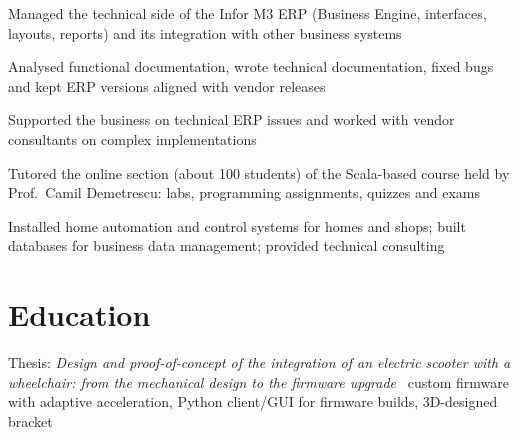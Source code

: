 \documentclass[a4paper,10pt]{article}
\begin{document}
\begin{cvitems}
  \item Managed the technical side of the Infor M3 ERP (Business Engine, interfaces, layouts, reports) and its integration with other business systems
  \item Analysed functional documentation, wrote technical documentation, fixed bugs and kept ERP versions aligned with vendor releases
  \item Supported the business on technical ERP issues and worked with vendor consultants on complex implementations
\end{cvitems}

\begin{cvitems}
  \item Tutored the online section (about 100 students) of the Scala-based course held by Prof.\ Camil Demetrescu: labs, programming assignments, quizzes and exams
\end{cvitems}


\begin{cvitems}
  \item Installed home automation and control systems for homes and shops; built databases for business data management; provided technical consulting
\end{cvitems}

\section{Education}

\begin{cvitems}
  \item Thesis: \textit{Design and proof-of-concept of the integration of an electric scooter with a wheelchair: from the mechanical design to the firmware upgrade} \textendash\ custom firmware with adaptive acceleration, Python client/GUI for firmware builds, 3D-designed bracket
\end{cvitems}
\end{document}
